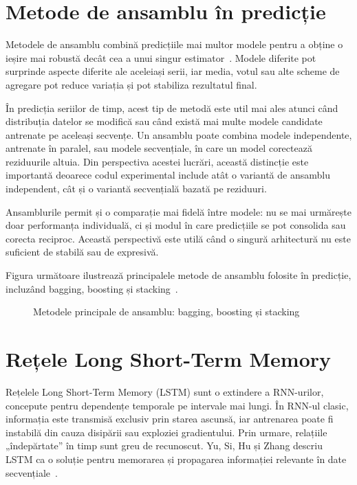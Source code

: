 \section{Metode de ansamblu în predicție}

Metodele de ansamblu combină predicțiile mai multor modele pentru a obține o ieșire mai robustă decât cea a unui singur estimator~\cite{dietterich2000ensemble, zhou2012ensemble}. Modele diferite pot surprinde aspecte diferite ale aceleiași serii, iar media, votul sau alte scheme de agregare pot reduce variația și pot stabiliza rezultatul final.

În predicția seriilor de timp, acest tip de metodă este util mai ales atunci când distribuția datelor se modifică sau când există mai multe modele candidate antrenate pe aceleași secvențe. Un ansamblu poate combina modele independente, antrenate în paralel, sau modele secvențiale, în care un model corectează reziduurile altuia. Din perspectiva acestei lucrări, această distincție este importantă deoarece codul experimental include atât o variantă de ansamblu independent, cât și o variantă secvențială bazată pe reziduuri.

Ansamblurile permit și o comparație mai fidelă între modele: nu se mai urmărește doar performanța individuală, ci și modul în care predicțiile se pot consolida sau corecta reciproc. Această perspectivă este utilă când o singură arhitectură nu este suficient de stabilă sau de expresivă.

Figura următoare ilustrează principalele metode de ansamblu folosite în predicție, incluzând bagging, boosting și stacking~\cite{dietterich2000ensemble, zhou2012ensemble}.

\begin{figure}[h!]
    \centering
    \caption{Metodele principale de ansamblu: bagging, boosting și stacking~\cite{kundu2024ensemble}}
    \label{fig:ensemble_methods}
\end{figure}

\section{Rețele Long Short-Term Memory}

Rețelele Long Short-Term Memory (LSTM) sunt o extindere a RNN-urilor, concepute pentru dependențe temporale pe intervale mai lungi. În RNN-ul clasic, informația este transmisă exclusiv prin starea ascunsă, iar antrenarea poate fi instabilă din cauza disipării sau exploziei gradientului. Prin urmare, relațiile „îndepărtate” în timp sunt greu de recunoscut. Yu, Si, Hu și Zhang descriu LSTM ca o soluție pentru memorarea și propagarea informației relevante în date secvențiale~\cite{yu2019lstmreview}.

